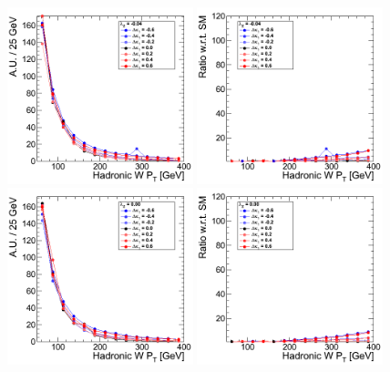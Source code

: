 \begin{figure}[h!t]
  {\centering
    \includegraphics[width=0.48\textwidth]{figs/HadronicWpT_m004.png}
    \includegraphics[width=0.48\textwidth]{figs/HadronicWpT_m004_ratio.png}
   \includegraphics[width=0.48\textwidth]{figs/HadronicWpT_000.png}
    \includegraphics[width=0.48\textwidth]{figs/HadronicWpT_000_ratio.png}
}
\end{figure}
